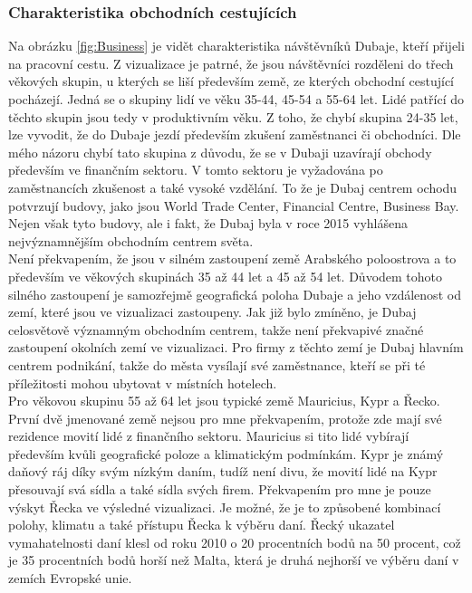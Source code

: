 \documentclass[czech,BP]{thesiskiv}
\begin{document}
\subsubsection{Charakteristika obchodních cestujících}
Na obrázku \ref{fig:Business} je vidět charakteristika návštěvníků Dubaje, kteří přijeli na pracovní cestu. Z vizualizace je patrné, že jsou návštěvníci rozděleni do třech věkových skupin, u kterých se liší především země, ze kterých obchodní cestující pocházejí. Jedná se o skupiny lidí ve věku 35-44, 45-54 a 55-64 let. Lidé patřící do těchto skupin jsou tedy v produktivním věku. Z toho, že chybí skupina 24-35 let, lze vyvodit, že do Dubaje jezdí především zkušení zaměstnanci či obchodníci. Dle mého názoru chybí tato skupina z důvodu, že se v Dubaji uzavírají obchody především ve finančním sektoru. V tomto sektoru je vyžadována po zaměstnancích zkušenost a také vysoké vzdělání. To že je Dubaj centrem ochodu potvrzují budovy, jako jsou World Trade Center, Financial Centre, Business Bay. Nejen však tyto budovy, ale i fakt, že Dubaj byla v roce 2015 vyhlášena nejvýznamnějším obchodním centrem světa.\cite{BusinessDubai} 
\\
Není překvapením, že jsou v silném zastoupení země Arabského poloostrova a to především ve věkových skupinách 35 až 44 let a 45 až 54 let. Důvodem tohoto silného zastoupení je samozřejmě geografická poloha Dubaje a jeho vzdálenost od zemí, které jsou ve vizualizaci zastoupeny. Jak již bylo zmíněno, je Dubaj celosvětově významným obchodním centrem, takže není překvapivé značné zastoupení okolních zemí ve vizualizaci. Pro firmy z těchto zemí je Dubaj hlavním centrem podnikání, takže do města vysílají své zaměstnance, kteří se při té příležitosti mohou ubytovat v místních hotelech.
\\
Pro věkovou skupinu 55 až 64 let jsou typické země Mauricius, Kypr a Řecko. První dvě jmenované země nejsou pro mne překvapením, protože zde mají své rezidence movití lidé z finančního sektoru. Mauricius si tito lidé vybírají především kvůli geografické poloze a klimatickým podmínkám. Kypr je známý daňový ráj díky svým nízkým daním, tudíž není divu, že movití lidé na Kypr přesouvají svá sídla a také sídla svých firem. Překvapením pro mne je pouze výskyt Řecka ve výsledné vizualizaci. Je možné, že je to způsobené kombinací polohy, klimatu a také přístupu Řecka k výběru daní. Řecký ukazatel vymahatelnosti daní klesl od roku 2010 o 20 procentních bodů na 50 procent, což je 35 procentních bodů horší než Malta, která je druhá nejhorší ve výběru daní v zemích Evropské unie.\cite{GreeceTaxes} 
\end{document}
